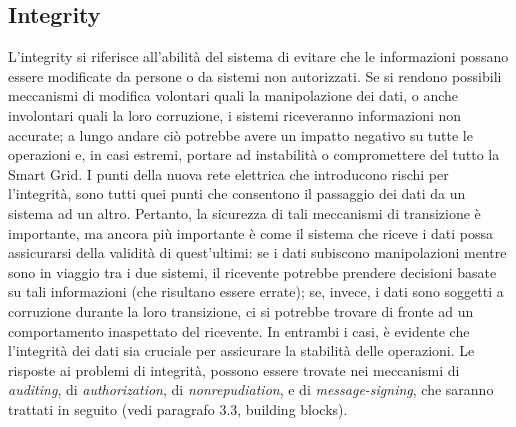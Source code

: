 \subsection{Integrity}
L'integrity si riferisce all'abilità del sistema di evitare che le informazioni possano essere modificate da persone o da sistemi non autorizzati. \newline Se si rendono possibili meccanismi di modifica volontari quali la manipolazione dei dati, o anche involontari quali la loro corruzione, i sistemi riceveranno informazioni non accurate; a lungo andare ciò potrebbe avere un impatto negativo su tutte le operazioni e, in casi estremi, portare ad instabilità o compromettere del tutto la Smart Grid. \newline
I punti della nuova rete elettrica che introducono rischi per l'integrità, sono tutti quei punti che consentono il passaggio dei dati da un sistema ad un altro. Pertanto, la sicurezza di tali meccanismi di transizione è importante, ma ancora più importante è come il sistema che riceve i dati possa assicurarsi della validità di quest'ultimi: se i dati subiscono manipolazioni mentre sono in viaggio tra i due sistemi, il ricevente potrebbe prendere decisioni basate su tali informazioni (che risultano essere errate); se, invece, i dati sono soggetti a corruzione durante la loro transizione, ci si potrebbe trovare di fronte ad un comportamento inaspettato del ricevente. In entrambi i casi, è evidente che l'integrità dei dati sia cruciale per assicurare la stabilità delle operazioni.   \newline
Le risposte ai problemi di integrità, possono essere trovate nei meccanismi di \textit{auditing}, di \textit{authorization}, di \textit{nonrepudiation}, e di \textit{message-signing}, che saranno trattati in seguito (vedi paragrafo 3.3, building blocks).



